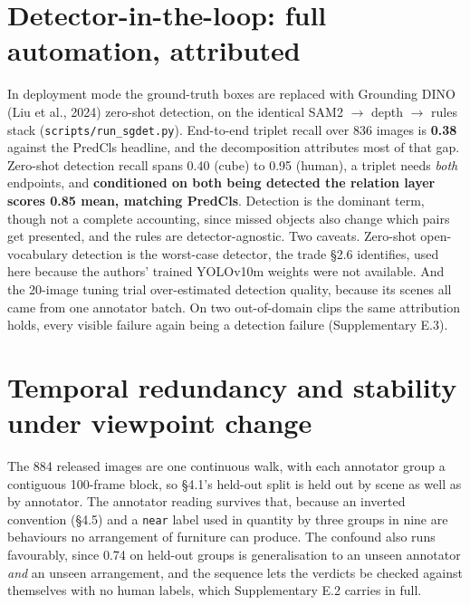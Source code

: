 \section{Detector-in-the-loop: full automation, attributed}

In deployment mode the ground-truth boxes are replaced with Grounding DINO (Liu et al., 2024) zero-shot detection, on the identical SAM2 $\rightarrow$ depth $\rightarrow$ rules stack (\texttt{scripts/run\_\allowbreak{}sgdet.py}). End-to-end triplet recall over 836 images is \textbf{0.38} against the PredCls headline, and the decomposition attributes most of that gap. Zero-shot detection recall spans 0.40 (cube) to 0.95 (human), a triplet needs \textit{both} endpoints, and \textbf{conditioned on both being detected the relation layer scores 0.85 mean, matching PredCls}. Detection is the dominant term, though not a complete accounting, since missed objects also change which pairs get presented, and the rules are detector-agnostic. Two caveats. Zero-shot open-vocabulary detection is the worst-case detector, the trade \S{}2.6 identifies, used here because the authors' trained YOLOv10m weights were not available. And the 20-image tuning trial over-estimated detection quality, because its scenes all came from one annotator batch. On two out-of-domain clips the same attribution holds, every visible failure again being a detection failure (Supplementary E.3).

\section{Temporal redundancy and stability under viewpoint change}

The 884 released images are one continuous walk, with each annotator group a contiguous 100-frame block, so \S{}4.1's held-out split is held out by scene as well as by annotator. The annotator reading survives that, because an inverted convention (\S{}4.5) and a \texttt{near} label used in quantity by three groups in nine are behaviours no arrangement of furniture can produce. The confound also runs favourably, since 0.74 on held-out groups is generalisation to an unseen annotator \textit{and} an unseen arrangement, and the sequence lets the verdicts be checked against themselves with no human labels, which Supplementary E.2 carries in full.

